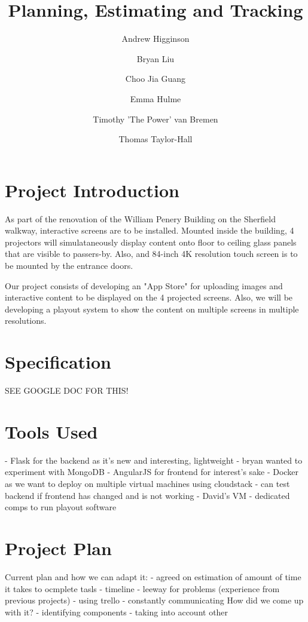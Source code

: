 \documentclass{article}
\begin{document}
\title{Planning, Estimating and Tracking}
\author{Andrew Higginson \and Bryan Liu \and Choo Jia Guang \and Emma Hulme \and Timothy 'The Power' van Bremen \and Thomas Taylor-Hall}
\maketitle

\section{Project Introduction}
As part of the renovation of the William Penery Building on the Sherfield 
walkway, interactive screens are to be installed. Mounted inside the building, 4
projectors will simulataneously display content onto floor to ceiling glass
panels that are visible to passers-by. Also, and 84-inch 4K resolution touch 
screen is to be mounted by the entrance doors. 

Our project consists of developing an "App Store" for uploading images and 
interactive content to be displayed on the 4 projected screens. Also, we will be
developing a playout system to show the content on multiple screens in multiple 
resolutions.

\section{Specification}
SEE GOOGLE DOC FOR THIS!

\section{Tools Used}
 	- Flask for the backend as it's new and interesting, lightweight
	- bryan wanted to experiment with MongoDB
	- AngularJS for frontend for interest's sake
	- Docker as we want to deploy on multiple virtual machines using cloudstack
	- can test backend if frontend has changed and is not working
  - David's VM
	- dedicated comps to run playout software

\section{Project Plan}
Current plan and how we can adapt it:
	- agreed on estimation of amount of time it takes to ocmplete tasls
  - timeline
  - leeway for problems (experience from previous projects)
  - using trello
  - constantly communicating
How did we come up with it? 
	- identifying components
	- taking into account other 
\end{document}
